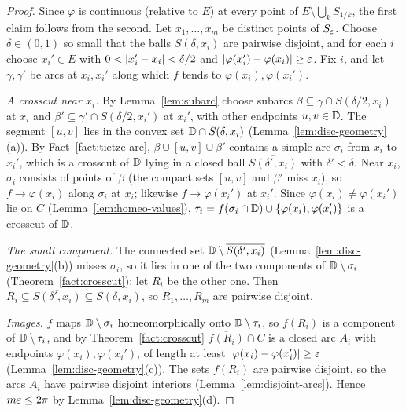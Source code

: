 \begin{proof}
Since $\varphi$ is continuous (relative to $E$) at every point of $E\setminus\bigcup_kS_{1/k}$, the first claim
follows from the second. Let $x_1,\dots,x_m$ be distinct points of $S_\varepsilon$. Choose $\delta\in(0,1)$ so small
that the balls $S(\delta,x_i)$ are pairwise disjoint, and for each $i$ choose $x_i'\in E$ with
$0<\lvert x_i'-x_i\rvert<\delta/2$ and $\lvert \varphi(x_i')-\varphi(x_i)\rvert\ge\varepsilon$. Fix $i$, and let
$\gamma,\gamma'$ be arcs at $x_i,x_i'$ along which $f$ tends to $\varphi(x_i),\varphi(x_i')$.

\emph{A crosscut near $x_i$.} By Lemma~\ref{lem:subarc} choose subarcs $\beta\subseteq\gamma\cap S(\delta/2,x_i)$ at
$x_i$ and $\beta'\subseteq\gamma'\cap S(\delta/2,x_i')$ at $x_i'$, with other endpoints $u,v\in\mathbb{D}$. The segment
$[u,v]$ lies in the convex set $\mathbb{D}\cap S(\delta,x_i)$ (Lemma~\ref{lem:disc-geometry}(a)). By
Fact~\ref{fact:tietze-arc}, $\beta\cup[u,v]\cup\beta'$ contains a simple arc $\sigma_i$ from $x_i$ to $x_i'$,
which is a crosscut of $\mathbb{D}$ lying in a closed ball $\overline{S(\delta',x_i)}$ with $\delta'<\delta$. Near $x_i$,
$\sigma_i$ consists of points of $\beta$ (the compact sets $[u,v]$ and $\beta'$ miss $x_i$), so $f\to\varphi(x_i)$
along $\sigma_i$ at $x_i$; likewise $f\to\varphi(x_i')$ at $x_i'$. Since $\varphi(x_i)\ne\varphi(x_i')$ lie on $C$
(Lemma~\ref{lem:homeo-values}), $\tau_i=f(\sigma_i\cap\mathbb{D})\cup\{\varphi(x_i),\varphi(x_i')\}$ is a crosscut of $\mathbb{D}$.

\emph{The small component.} The connected set $\mathbb{D}\setminus\overline{S(\delta',x_i)}$
(Lemma~\ref{lem:disc-geometry}(b)) misses $\sigma_i$, so it lies in one of the two components of $\mathbb{D}\setminus\sigma_i$
(Theorem~\ref{fact:crosscut}); let $R_i$ be the other one. Then $R_i\subseteq\overline{S(\delta',x_i)}\subseteq S(\delta,x_i)$,
so $R_1,\dots,R_m$ are pairwise disjoint.

\emph{Images.} $f$ maps $\mathbb{D}\setminus\sigma_i$ homeomorphically onto $\mathbb{D}\setminus\tau_i$, so $f(R_i)$ is a component
of $\mathbb{D}\setminus\tau_i$, and by Theorem~\ref{fact:crosscut} $\overline{f(R_i)}\cap C$ is a closed arc $A_i$ with
endpoints $\varphi(x_i),\varphi(x_i')$, of length at least $\lvert \varphi(x_i)-\varphi(x_i')\rvert\ge\varepsilon$
(Lemma~\ref{lem:disc-geometry}(c)). The sets $f(R_i)$ are pairwise disjoint, so the arcs $A_i$ have pairwise
disjoint interiors (Lemma~\ref{lem:disjoint-arcs}). Hence $m\varepsilon\le2\pi$ by Lemma~\ref{lem:disc-geometry}(d).
\end{proof}
